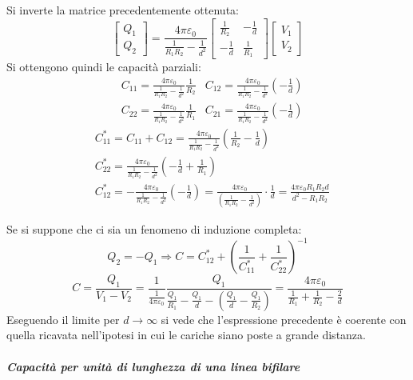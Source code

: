 Si inverte la matrice precedentemente ottenuta:
$$
\begin{bmatrix}
Q_1\\
Q_2
\end{bmatrix} = \frac{4\pi \varepsilon_0}{\frac{1}{R_1R_2}-\frac{1}{d^2}} \begin{bmatrix}
\frac{1}{R_2} & -\frac{1}{d}\\
-\frac{1}{d} & \frac{1}{R_1}
\end{bmatrix}\begin{bmatrix}
V_1 \\
V_2
\end{bmatrix}
$$
Si ottengono quindi le capacità parziali:
\begin{align*}
&C_{11} = \frac{4\pi\varepsilon_0}{\frac{1}{R_1R_2}-\frac{1}{d^2}}\frac{1}{R_2} & C_{12} = 
\frac{4\pi\varepsilon_0}{\frac{1}{R_1R_2}-\frac{1}{d^2}}\left(-\frac{1}{d}\right)\\
&C_{22} = \frac{4\pi\varepsilon_0}{\frac{1}{R_1R_2}-\frac{1}{d^2}}\frac{1}{R_1} & C_{21} = 
\frac{4\pi\varepsilon_0}{\frac{1}{R_1R_2}-\frac{1}{d^2}}\left(-\frac{1}{d}\right)
\end{align*}
\begin{align*}
&C_{11}^* = C_{11} + C_{12} = \frac{4\pi\varepsilon_0}{\frac{1}{R_1R_2}-\frac{1}{d^2}}
\left(\frac{1}{R_2} - \frac{1}{d}\right)\\
&C_{22}^* = \frac{4\pi\varepsilon_0}{\frac{1}{R_1R_2}-\frac{1}{d^2}}
\left(-\frac{1}{d} + \frac{1}{R_1}\right)\\
&C_{12}^* = -\frac{4 \pi \varepsilon_0}{\frac{1}{R_1R_2}-\frac{1}{d^2}}\left(-\frac{1}{d}\right) =
\frac{4 \pi \varepsilon_0}{\left(\frac{1}{R_1R_2} - \frac{1}{d^2}\right)}\cdot\frac{1}{d} = \frac{4\pi\varepsilon_0 R_1R_2d}{d^2-R_1R_2}
\end{align*}

Se si suppone che ci sia un fenomeno di induzione completa: 
$$
Q_2 = -Q_1 \Rightarrow C = C_{12}^* +
\left(\frac{1}{C_{11}^*} + \frac{1}{C_{22}^*}\right)^{-1}
$$
$$
C = \frac{Q_1}{V_1-V_2} = \frac{1}{\frac{1}{4\pi\varepsilon_0}}\frac{Q_1}{\frac{Q_1}{R_1} -
\frac{Q_1}{d}-\left(\frac{Q_1}{d}-\frac{Q_1}{R_2}\right)} =
\frac{4\pi\varepsilon_0}{\frac{1}{R_1} + \frac{1}{R_2} - \frac{2}{d}}
$$
Eseguendo il limite per $d\to \infty$ si vede che l'espressione precedente è coerente con quella 
ricavata nell'ipotesi in cui le cariche siano poste a grande distanza.


\subparagraph{Capacità per unità di lunghezza di una linea bifilare}

